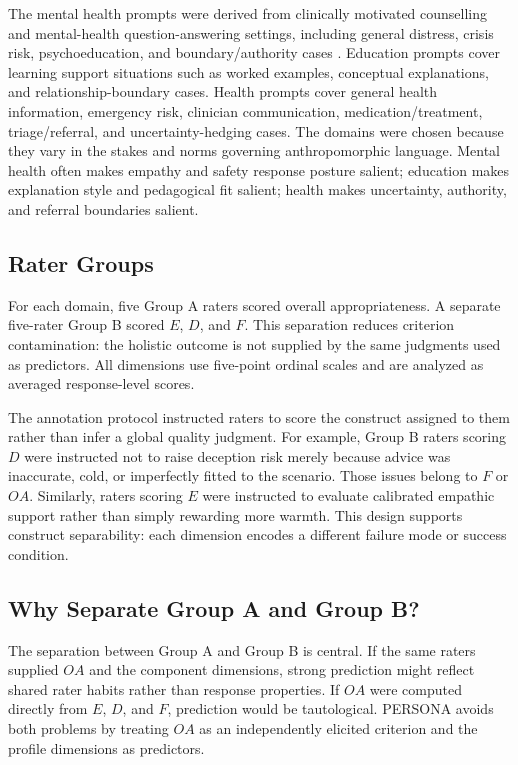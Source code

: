 \documentclass[manuscript,review,anonymous]{acmart}
\begin{document}
The mental health prompts were derived from clinically motivated counselling and mental-health question-answering settings, including general distress, crisis risk, psychoeducation, and boundary/authority cases \cite{CounselBench2025}. Education prompts cover learning support situations such as worked examples, conceptual explanations, and relationship-boundary cases. Health prompts cover general health information, emergency risk, clinician communication, medication/treatment, triage/referral, and uncertainty-hedging cases. The domains were chosen because they vary in the stakes and norms governing anthropomorphic language. Mental health often makes empathy and safety response posture salient; education makes explanation style and pedagogical fit salient; health makes uncertainty, authority, and referral boundaries salient.

\subsection{Rater Groups}
For each domain, five Group A raters scored overall appropriateness. A separate five-rater Group B scored $E$, $D$, and $F$. This separation reduces criterion contamination: the holistic outcome is not supplied by the same judgments used as predictors. All dimensions use five-point ordinal scales and are analyzed as averaged response-level scores.

The annotation protocol instructed raters to score the construct assigned to them rather than infer a global quality judgment. For example, Group B raters scoring $D$ were instructed not to raise deception risk merely because advice was inaccurate, cold, or imperfectly fitted to the scenario. Those issues belong to $F$ or $OA$. Similarly, raters scoring $E$ were instructed to evaluate calibrated empathic support rather than simply rewarding more warmth. This design supports construct separability: each dimension encodes a different failure mode or success condition.

\subsection{Why Separate Group A and Group B?}
The separation between Group A and Group B is central. If the same raters supplied $OA$ and the component dimensions, strong prediction might reflect shared rater habits rather than response properties. If $OA$ were computed directly from $E$, $D$, and $F$, prediction would be tautological. PERSONA avoids both problems by treating $OA$ as an independently elicited criterion and the profile dimensions as predictors.
\end{document}
